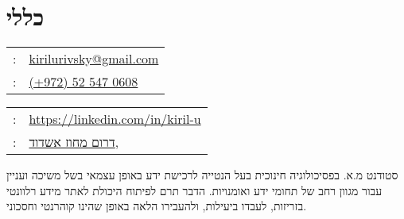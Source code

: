 \setRTL
\hspace{.25\textwidth}
\begin{minipage}[t]{.5\textwidth}
	\par{\par}
\end{minipage}
\section{כללי}
\unsetRTL
\setLTR
\begin{minipage}[t]{.5\linewidth}
	\begin{tabular}{rp{.75\linewidth}}
		\baselineskip=20pt
		\email{} : &\href{mailto:kirilurivsky@gmail.com}{kirilurivsky@gmail.com}\\
		\phone{} : &\href{tel:972525470608}{(+972) 52 547 0608}
	\end{tabular}
\end{minipage}
\begin{minipage}[t]{.5\linewidth}
	\begin{tabular}{rl}
		\linkedin{} : &\href{https://www.linkedin.com/in/kiril-u}{https://linkedin.com/in/kiril-u}\\
		\location{} : &\href{https://goo.gl/maps/MSacjpSy7vZSKykP7}{דרום מחוז אשדוד,}
	\end{tabular}
\end{minipage}	
\unsetLTR
\unsetRTL
\setRTL
\begin{minipage}[t]{1\linewidth}
	\vspace{0.25cm} %
סטודנט מ.א. בפסיכולוגיה חינוכית בעל הנטייה לרכישת ידע באופן עצמאי בשל משיכה ועניין עבור מגוון רחב של תחומי ידע ואומנויות. הדבר תרם לפיתוח היכולת לאתר מידע רלוונטי בזריזות, לעבדו ביעילות, ולהעבירו הלאה באופן שהינו קוהרנטי וחסכוני. 
\end{minipage}

%

